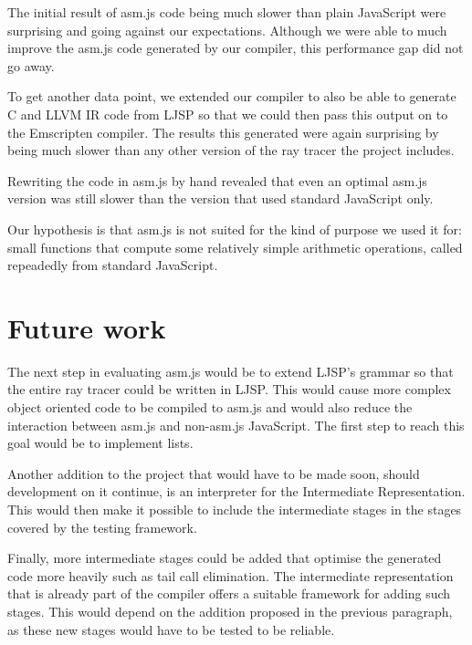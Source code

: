 \documentclass[11pt]{report}
\begin{document}
The initial result of asm.js code being much slower than plain JavaScript were surprising and going against our expectations. Although we were able to much improve the asm.js code generated by our compiler, this performance gap did not go away. 

To get another data point, we extended our compiler to also be able to generate C and LLVM IR code from LJSP so that we could then pass this output on to the Emscripten compiler. The results this generated were again surprising by being much slower than any other version of the ray tracer the project includes.

Rewriting the code in asm.js by hand revealed that even an optimal asm.js version was still slower than the version that used standard JavaScript only.

Our hypothesis is that asm.js is not suited for the kind of purpose we used it for: small functions that compute some relatively simple arithmetic operations, called repeadedly from standard JavaScript.

\section{Future work}

The next step in evaluating asm.js would be to extend LJSP's grammar so that the entire ray tracer could be written in LJSP. This would cause more complex object oriented code to be compiled to asm.js and would also reduce the interaction between asm.js and non-asm.js JavaScript. The first step to reach this goal would be to implement lists.

Another addition to the project that would have to be made soon, should development on it continue, is an interpreter for the Intermediate Representation. This would then make it possible to include the intermediate stages in the stages covered by the testing framework.

Finally, more intermediate stages could be added that optimise the generated code more heavily such as tail call elimination. The intermediate representation that is already part of the compiler offers a suitable framework for adding such stages. This would depend on the addition proposed in the previous paragraph, as these new stages would have to be tested to be reliable.



\end{document}
